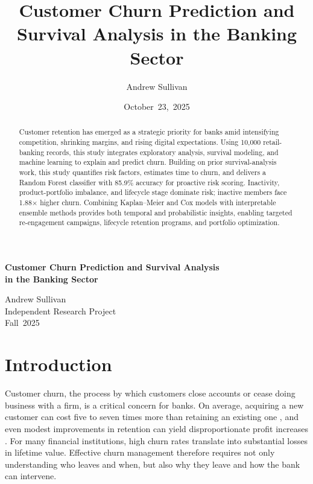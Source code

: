 \documentclass[12pt]{article}
\title{Customer Churn Prediction and Survival Analysis in the Banking Sector}
\author{Andrew Sullivan}
\date{October~23,~2025}
\begin{document}
\begin{titlepage}
  \centering
  \vspace*{2cm}
  \Huge\textbf{Customer Churn Prediction and Survival Analysis\\in the Banking Sector}
  \vspace{1.5cm}

  \large
  Andrew Sullivan\\[0.5cm]
  Independent Research Project\\[0.5cm]
  Fall~2025
  
  \vfill
\end{titlepage}

\newpage
\begin{abstract}
Customer retention has emerged as a strategic priority for banks amid intensifying competition, shrinking margins, and rising digital expectations. Using 10,000 retail-banking records, this study integrates exploratory analysis, survival modeling, and machine learning to explain and predict churn. Building on prior survival-analysis work, this study quantifies risk factors, estimates time to churn, and delivers a Random Forest classifier with 85.9\% accuracy for proactive risk scoring. Inactivity, product-portfolio imbalance, and lifecycle stage dominate risk; inactive members face 1.88× higher churn. Combining Kaplan–Meier and Cox models with interpretable ensemble methods provides both temporal and probabilistic insights, enabling targeted re-engagement campaigns, lifecycle retention programs, and portfolio optimization.
\end{abstract}

\newpage
{}
\tableofcontents
\newpage
{}

\section{Introduction}
Customer churn, the process by which customers close accounts or cease doing business with a firm, is a critical concern for banks.  On average, acquiring a new customer can cost five to seven times more than retaining an existing one \citep{businessbuilders2024cost}, and even modest improvements in retention can yield disproportionate profit increases \citep{kumar2022customerretention}.  For many financial institutions, high churn rates translate into substantial losses in lifetime value.  Effective churn management therefore requires not only understanding who leaves and when, but also why they leave and how the bank can intervene.
\end{document}
